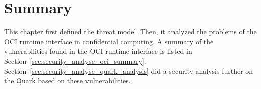 \section{Summary}
\label{sec:security_summarize}

This chapter first defined the threat model. Then, it analyzed the problems of the OCI runtime interface in confidential computing. A summary of the vulnerabilities found in the OCI runtime interface is listed in Section~\ref{sec:security_analyse_oci_summary}. Section~\ref{sec:security_analyse_quark_analysis} did a security analysis further on the Quark 
based on these vulnerabilities.
 
\cleardoublepage

